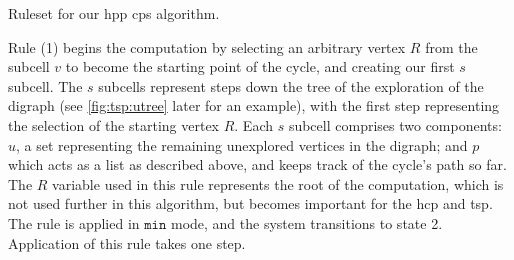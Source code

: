 


\begin{cprulesetfloat}
    \begin{cpruleset}
        
        
        
    \end{cpruleset}
    \caption[Ruleset for the ]{\label{ruleset:tsp:hpp}Ruleset for our \gls{hpp} \gls{cps} algorithm.}
\end{cprulesetfloat}

Rule (1) begins the computation by selecting an arbitrary vertex \(R\) from the subcell \(v\) to become the starting point of the cycle, and creating our first \(s\) subcell.  The \(s\) subcells represent steps down the tree of the exploration of the digraph (see \autoref{fig:tsp:utree} later for an example), with the first step representing the selection of the starting vertex \(R\).  Each \(s\) subcell comprises two components: \(u\), a set representing the remaining unexplored vertices in the digraph; and \(p\) which acts as a list as described above, and keeps track of the cycle's path so far.  The \(R\) variable used in this rule represents the root of the computation, which is not used further in this algorithm, but becomes important for the \gls{hcp} and \gls{tsp}.  The rule is applied in \(\mathtt{min}\) mode, and the system transitions to state 2.  Application of this rule takes one step.

